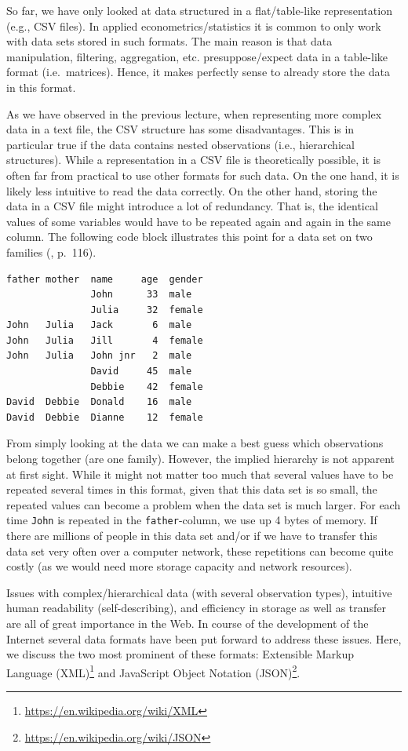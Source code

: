 \documentclass[
  12pt,
]{style/krantz}
\renewcommand{\href}[2]{#2\footnote{\url{#1}}}
\begin{document}
So far, we have only looked at data structured in a flat/table-like representation (e.g., CSV files). In applied econometrics/statistics it is common to only work with data sets stored in such formats. The main reason is that data manipulation, filtering, aggregation, etc. presuppose/expect data in a table-like format (i.e.~matrices). Hence, it makes perfectly sense to already store the data in this format.

As we have observed in the previous lecture, when representing more complex data in a text file, the CSV structure has some disadvantages. This is in particular true if the data contains nested observations (i.e., hierarchical structures). While a representation in a CSV file is theoretically possible, it is often far from practical to use other formats for such data. On the one hand, it is likely less intuitive to read the data correctly. On the other hand, storing the data in a CSV file might introduce a lot of redundancy. That is, the identical values of some variables would have to be repeated again and again in the same column. The following code block illustrates this point for a data set on two families (\citep{murrell_2009}, p.~116).

\begin{verbatim}
father mother  name     age  gender
               John      33  male
               Julia     32  female
John   Julia   Jack       6  male
John   Julia   Jill       4  female
John   Julia   John jnr   2  male
               David     45  male
               Debbie    42  female
David  Debbie  Donald    16  male
David  Debbie  Dianne    12  female
\end{verbatim}

From simply looking at the data we can make a best guess which observations belong together (are one family). However, the implied hierarchy is not apparent at first sight. While it might not matter too much that several values have to be repeated several times in this format, given that this data set is so small, the repeated values can become a problem when the data set is much larger. For each time \texttt{John} is repeated in the \texttt{father}-column, we use up 4 bytes of memory. If there are millions of people in this data set and/or if we have to transfer this data set very often over a computer network, these repetitions can become quite costly (as we would need more storage capacity and network resources).

Issues with complex/hierarchical data (with several observation types), intuitive human readability (self-describing), and efficiency in storage as well as transfer are all of great importance in the Web. In course of the development of the Internet several data formats have been put forward to address these issues. Here, we discuss the two most prominent of these formats: \href{https://en.wikipedia.org/wiki/XML}{Extensible Markup Language (XML)} and \href{https://en.wikipedia.org/wiki/JSON}{JavaScript Object Notation (JSON)}.
\end{document}
